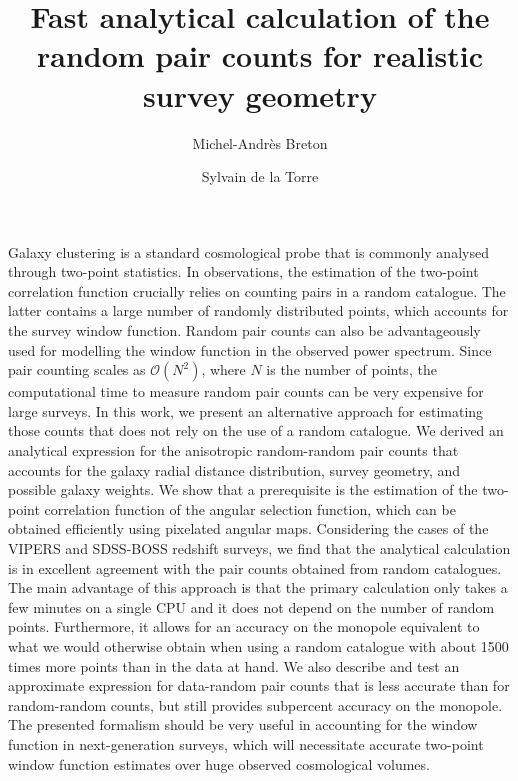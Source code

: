 \documentclass{aa}
\begin{document}
 

   \title{Fast analytical calculation of the random pair counts for realistic survey geometry}

   \author{Michel-Andr\`es Breton  \and Sylvain de la Torre } 



 
  \abstract
  {Galaxy clustering is a standard cosmological probe that is commonly analysed through two-point statistics. In observations, the estimation of the two-point correlation function crucially relies on counting pairs in a random catalogue. The latter contains a large number of randomly distributed points, which accounts for the survey window function. Random pair counts can also be advantageously used for modelling the window function in the observed power spectrum. Since pair counting scales as $\mathcal{O}(N^2)$, where $N$ is the number of points, the computational time to measure random pair counts can be very expensive for large surveys. In this work, we present an alternative approach for estimating those counts that does not rely on the use of a random catalogue. We derived an analytical expression for the anisotropic random-random pair counts that accounts for the galaxy radial distance distribution, survey geometry, and possible galaxy weights. We show that a prerequisite is the estimation of the two-point correlation function of the angular selection function, which can be obtained efficiently using pixelated angular maps. 
  Considering the cases of the VIPERS and SDSS-BOSS redshift surveys, we find that the analytical calculation is in excellent agreement with the pair counts obtained from random catalogues. The main advantage of this approach is that the primary calculation only takes a few minutes on a single CPU and it does not depend on the number of random points. Furthermore, it allows for an accuracy on the monopole equivalent to what we would otherwise obtain when using a random catalogue with about 1500 times more points than in the data at hand. We also describe and test an approximate expression for data-random pair counts that is less accurate than for random-random counts, but still provides subpercent accuracy on the monopole. The presented formalism should be very useful in accounting for the window function in next-generation surveys, which will necessitate accurate two-point window function estimates over huge observed cosmological volumes.}
\end{document}
